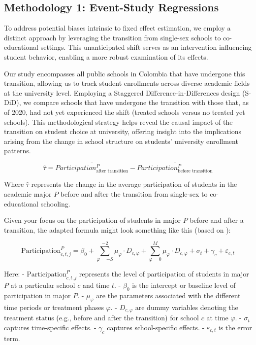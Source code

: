 \subsection{Methodology 1: Event-Study Regressions}

To address potential biases intrinsic to fixed effect estimation, we employ a distinct approach by leveraging the transition from single-sex schools to co-educational settings. This unanticipated shift serves as an intervention influencing student behavior, enabling a more robust examination of its effects.

Our study encompasses all public schools in Colombia that have undergone this transition, allowing us to track student enrollments across diverse academic fields at the university level. Employing a Staggered Difference-in-Differences design (S-DiD), we compare schools that have undergone the transition with those that, as of 2020, had not yet experienced the shift (treated schools versus no treated yet schools). This methodological strategy helps reveal the causal impact of the transition on student choice at university, offering insight into the implications arising from the change in school structure on students' university enrollment patterns.

\begin{equation} 
\hat{\tau} = \bar{Participation^P_{ \text{after transition}} } - \bar{Participation^P_{ \text{before transition}} }
\end{equation}

Where \( \hat{\tau} \) represents the change in the average participation of students in the academic major \( P \) before and after the transition from single-sex to co-educational schooling.

Given your focus on the participation of students in major \( P \) before and after a transition, the adapted formula might look something like this (based on \citet{SUN2021175} ):

\begin{equation} 
\text{Participation}_{c,t,j}^P = \beta_0 + \sum_{\varphi = -S}^{-2} \mu_{\varphi} \cdot D_{c,\varphi} + \sum_{\varphi = 0}^{M} \mu_{\varphi} \cdot D_{c,\varphi} + \sigma_t + \gamma_c + \varepsilon_{c,t}
\end{equation}

Here:
- \( \text{Participation}_{c,t,j}^P \) represents the level of participation of students in major \( P \) at a particular school \( c \) and time \( t \).
- \( \beta_0 \) is the intercept or baseline level of participation in major \( P \).
- \( \mu_{\varphi} \) are the parameters associated with the different time periods or treatment phases \( \varphi \).
- \( D_{c,\varphi} \) are dummy variables denoting the treatment status (e.g., before and after the transition) for school \( c \) at time \( \varphi \).
- \( \sigma_t \) captures time-specific effects.
- \( \gamma_c \) captures school-specific effects.
- \( \varepsilon_{c,t} \) is the error term.

